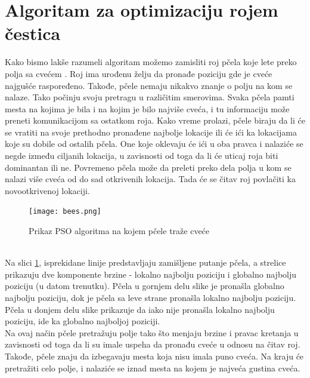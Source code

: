 \documentclass[a4paper]{article}
\begin{document}
\section{Algoritam za optimizaciju rojem čestica}
Kako bismo lakše razumeli algoritam možemo zamisliti roj pčela koje lete preko polja sa cvećem \cite{10.4018/IJRSDA.2018040101}. Roj ima urođenu želju da pronađe poziciju gde je cveće najgušće raspoređeno. Takođe, pčele nemaju nikakvo znanje o polju na kom se nalaze. Tako počinju svoju pretragu u različitim smerovima. Svaka pčela pamti mesta na kojima je bila i na kojim je bilo najviše cveća, i tu informaciju može preneti komunikacijom sa ostatkom roja. Kako vreme prolazi, pčele biraju da li će se vratiti na svoje prethodno pronađene najbolje lokacije ili će ići ka lokacijama koje su dobile od ostalih pčela. One koje oklevaju će ići u oba pravca i nalaziće se negde između ciljanih lokacija, u zavisnosti od toga da li će uticaj roja biti dominantan ili ne. Povremeno pčela može da preleti preko dela polja u kom se nalazi više cveća od do sad otkrivenih lokacija. Tada će se čitav roj povlačiti ka novootkrivenoj lokaciji.
\begin{figure}[htp]
    \centering
    \texttt{[image: bees.png]}
    \caption{Prikaz PSO algoritma na kojem pčele traže cveće}
    \label{fig:bees}
\end{figure}
\\ \indent Na slici \ref{fig:bees}, isprekidane linije predstavljaju zamišljene putanje pčela, a strelice prikazuju dve komponente brzine - lokalno najbolju poziciju i globalno najbolju poziciju (u datom trenutku). Pčela u gornjem delu slike je pronašla globalno najbolju poziciju, dok je pčela sa leve strane pronašla lokalno najbolju poziciju. Pčela u donjem delu slike prikazuje da iako nije pronašla lokalno najbolju poziciju, ide ka globalno najboljoj poziciji. \\
\indent Na ovaj način pčele pretražuju polje tako što menjaju brzine i pravac kretanja u zavisnosti od toga da li su imale uspeha da pronađu cveće u odnosu na čitav roj. Takođe, pčele znaju da izbegavaju mesta koja nisu imala puno cveća. Na kraju će pretražiti celo polje, i nalaziće se iznad mesta na kojem je najveća gustina cveća.
\end{document}
